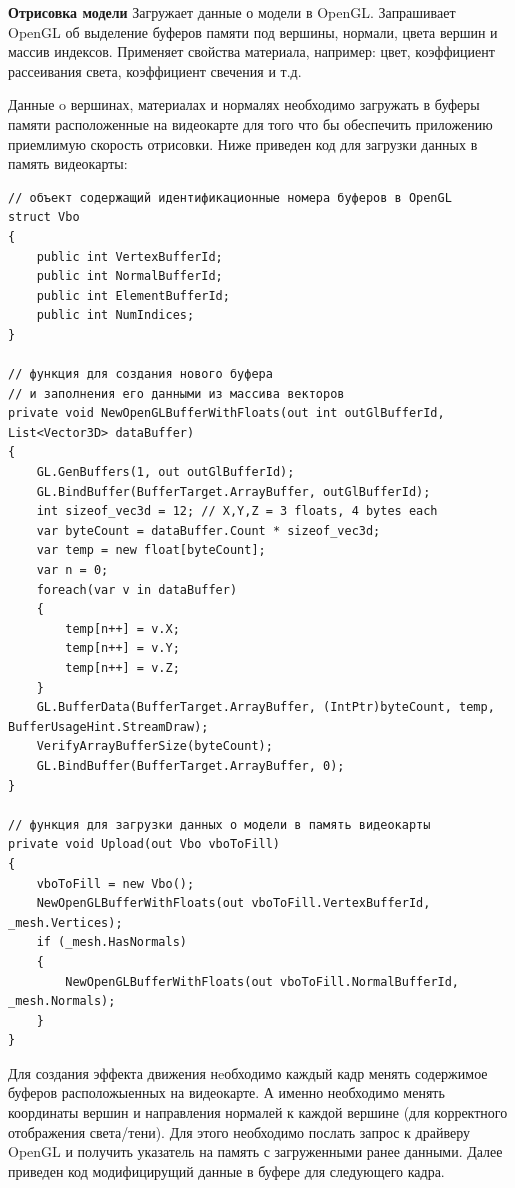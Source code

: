 \textbf{Отрисовка модели}
Загружает данные о модели в OpenGL.
Запрашивает OpenGL об выделение буферов памяти под вершины, нормали, цвета вершин и массив индексов. Применяет свойства материала, например: цвет, коэффициент рассеивания света, коэффициент свечения и т.д.

Данные o вершинах, материалах и нормалях необходимо загружать в буферы памяти расположенные на видеокарте для того что бы обеспечить приложению приемлимую скорость отрисовки.
Ниже приведен код для загрузки данных в память видеокарты:

\begin{verbatim}
// объект содержащий идентификационные номера буферов в OpenGL
struct Vbo
{
    public int VertexBufferId;
    public int NormalBufferId;
    public int ElementBufferId;
    public int NumIndices;
}

// функция для создания нового буфера 
// и заполнения его данными из массива векторов
private void NewOpenGLBufferWithFloats(out int outGlBufferId, List<Vector3D> dataBuffer) 
{
    GL.GenBuffers(1, out outGlBufferId);
    GL.BindBuffer(BufferTarget.ArrayBuffer, outGlBufferId);
    int sizeof_vec3d = 12; // X,Y,Z = 3 floats, 4 bytes each
    var byteCount = dataBuffer.Count * sizeof_vec3d;
    var temp = new float[byteCount];
    var n = 0;
    foreach(var v in dataBuffer)
    {
        temp[n++] = v.X;
        temp[n++] = v.Y;
        temp[n++] = v.Z;
    }
    GL.BufferData(BufferTarget.ArrayBuffer, (IntPtr)byteCount, temp, BufferUsageHint.StreamDraw);
    VerifyArrayBufferSize(byteCount);
    GL.BindBuffer(BufferTarget.ArrayBuffer, 0);
}

// функция для загрузки данных о модели в память видеокарты
private void Upload(out Vbo vboToFill)
{
    vboToFill = new Vbo();    
    NewOpenGLBufferWithFloats(out vboToFill.VertexBufferId, _mesh.Vertices);
    if (_mesh.HasNormals)
    {
        NewOpenGLBufferWithFloats(out vboToFill.NormalBufferId, _mesh.Normals);
    }
}

\end{verbatim}

Для создания эффекта движения нeобходимо каждый кадр менять содержимое буферов расположыенных на видеокарте.
А именно необходимо менять координаты вершин и направления нормалей к каждой вершине (для корректного отображения света/тени).
Для этого необходимо послать запрос к драйверу OpenGL и получить указатель на память с загруженными ранее данными.
Далее приведен код модифицирущий данные в буфере для следующего кадра.

